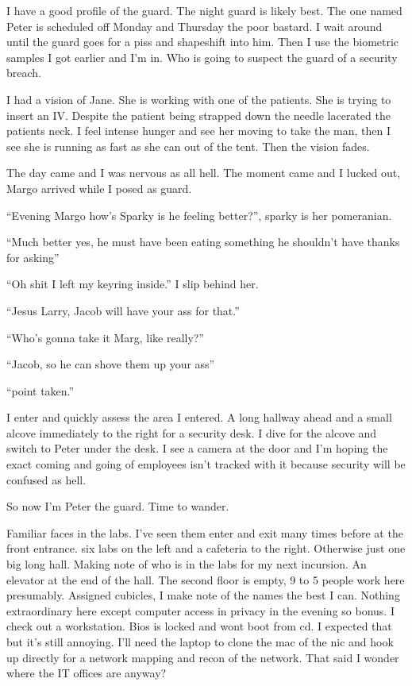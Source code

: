 I have a good profile of the guard. The night guard is likely best. The one named Peter is scheduled off Monday and Thursday the poor bastard. I wait around until the guard goes for a piss and shapeshift into him. Then I use the biometric samples I got earlier and I'm in. Who is going to suspect the guard of a security breach. 

I had a vision of Jane. She is working with one of the patients. She is trying to insert an IV. Despite the patient being strapped down the needle lacerated the patients neck. I feel intense hunger and see her moving to take the man, then I see she is running as fast as she can out of the tent. Then the vision fades.

The day came and I was nervous as all hell. The moment came and I lucked out, Margo arrived while I posed as guard.

``Evening Margo how's Sparky is he feeling better?'', sparky is her pomeranian.

``Much better yes, he must have been eating something he shouldn't have thanks for asking''

``Oh shit I left my keyring inside.'' I slip behind her.

``Jesus Larry, Jacob will have your ass for that.''

``Who's gonna take it Marg, like really?''

``Jacob, so he can shove them up your ass''

``point taken.''

I enter and quickly assess the area I entered. A long hallway ahead and a small alcove immediately to the right for a security desk. I dive for the alcove and switch to Peter under the desk. I see a camera at the door and I'm hoping the exact coming and going of employees isn't tracked with it because security will be confused as hell.

So now I'm Peter the guard. Time to wander.

Familiar faces in the labs. I've seen them enter and exit many times before at the front entrance. six labs on the left and a cafeteria to the right. Otherwise just one big long hall. Making note of who is in the labs for my next incursion. An elevator at the end of the hall. The second floor is empty, 9 to 5 people work here presumably. Assigned cubicles, I make note of the names the best I can. Nothing extraordinary here except computer access in privacy in the evening so bonus. I check out a workstation. Bios is locked and wont boot from cd. I expected that but it's still annoying. I'll need the laptop to clone the mac of the nic and hook up directly for a network mapping and recon of the network. That said I wonder where the IT offices are anyway?

